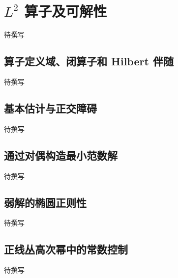 
% 
% 

\section{\texorpdfstring{\(L^2\)}{L²} 算子及可解性}
\label{g4:sec:1901}

待撰写

\subsection{算子定义域、闭算子和 Hilbert 伴随}
\label{g4:subsec:1901:01}
待撰写

\subsection{基本估计与正交障碍}
\label{g4:subsec:1901:02}
待撰写

\subsection{通过对偶构造最小范数解}
\label{g4:subsec:1901:03}
待撰写

\subsection{弱解的椭圆正则性}
\label{g4:subsec:1901:04}
待撰写

\subsection{正线丛高次幂中的常数控制}
\label{g4:subsec:1901:05}
待撰写
